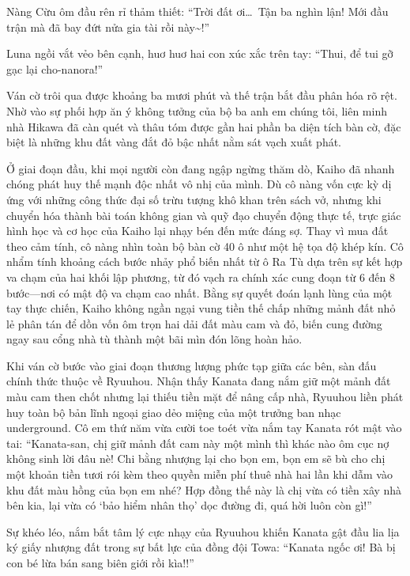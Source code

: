\documentclass[../main.tex]{subfiles}
\begin{document}
Nàng Cừu ôm đầu rên rỉ thảm thiết: ``Trời đất ơi\dots\ Tận ba nghìn lận! Mới đầu trận mà đã bay đứt nửa gia tài rồi này\~{}!''

Luna ngồi vắt vẻo bên cạnh, huơ huơ hai con xúc xắc trên tay: ``Thui, để tui gỡ gạc lại cho-nanora!''

Ván cờ trôi qua được khoảng ba mươi phút và thế trận bắt đầu phân hóa rõ rệt. Nhờ vào sự phối hợp ăn ý không tưởng của bộ ba anh em chúng tôi, liên minh nhà Hikawa đã càn quét và thâu tóm được gần hai phần ba diện tích bàn cờ, đặc biệt là những khu đất vàng đắt đỏ bậc nhất nằm sát vạch xuất phát.

Ở giai đoạn đầu, khi mọi người còn đang ngập ngừng thăm dò, Kaiho đã nhanh chóng phát huy thế mạnh độc nhất vô nhị của mình. Dù cô nàng vốn cực kỳ dị ứng với những công thức đại số trừu tượng khô khan trên sách vở, nhưng khi chuyển hóa thành bài toán không gian và quỹ đạo chuyển động thực tế, trực giác hình học và cơ học của Kaiho lại nhạy bén đến mức đáng sợ. Thay vì mua đất theo cảm tính, cô nàng nhìn toàn bộ bàn cờ 40 ô như một hệ tọa độ khép kín. Cô nhẩm tính khoảng cách bước nhảy phổ biến nhất từ ô Ra Tù dựa trên sự kết hợp va chạm của hai khối lập phương, từ đó vạch ra chính xác cung đoạn từ 6 đến 8 bước—nơi có mật độ va chạm cao nhất. Bằng sự quyết đoán lạnh lùng của một tay thực chiến, Kaiho không ngần ngại vung tiền thế chấp những mảnh đất nhỏ lẻ phân tán để dồn vốn ôm trọn hai dải đất màu cam và đỏ, biến cung đường ngay sau cổng nhà tù thành một bãi mìn đón lõng hoàn hảo.

Khi ván cờ bước vào giai đoạn thương lượng phức tạp giữa các bên, sàn đấu chính thức thuộc về Ryuuhou. Nhận thấy Kanata đang nắm giữ một mảnh đất màu cam then chốt nhưng lại thiếu tiền mặt để nâng cấp nhà, Ryuuhou liền phát huy toàn bộ bản lĩnh ngoại giao dẻo miệng của một trưởng ban nhạc underground. Cô em thứ năm vừa cười toe toét vừa nắm tay Kanata rót mật vào tai: ``Kanata-san, chị giữ mảnh đất cam này một mình thì khác nào ôm cục nợ không sinh lời đâu nè! Chi bằng nhượng lại cho bọn em, bọn em sẽ bù cho chị một khoản tiền tươi rói kèm theo quyền miễn phí thuê nhà hai lần khi dẫm vào khu đất màu hồng của bọn em nhé? Hợp đồng thế này là chị vừa có tiền xây nhà bên kia, lại vừa có `bảo hiểm nhân thọ' dọc đường đi, quá hời luôn còn gì!''

Sự khéo léo, nắm bắt tâm lý cực nhạy của Ryuuhou khiến Kanata gật đầu lia lịa ký giấy nhượng đất trong sự bất lực của đồng đội Towa: ``Kanata ngốc ơi! Bà bị con bé lừa bán sang biên giới rồi kìa!!''
\end{document}
